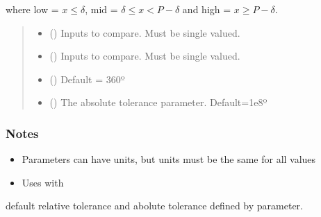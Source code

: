 \documentclass[letterpaper,10pt,english]{sphinxmanual}
\begin{document}
\begin{fulllineitems}
\sphinxAtStartPar
where low = \(x \leq \delta\), mid = \(\delta \leq x < P-\delta\) and
high = \(x \geq P - \delta\).
\begin{quote}\begin{description}
\begin{itemize}
\item {} 
\sphinxAtStartPar
{} (\sphinxstyleliteralemphasis{\sphinxupquote{, }}) \textendash{} Inputs to compare. Must be single valued.

\item {} 
\sphinxAtStartPar
{} (\sphinxstyleliteralemphasis{\sphinxupquote{, }}) \textendash{} Inputs to compare. Must be single valued.

\item {} 
\sphinxAtStartPar
{} () \textendash{} Default = 360º

\item {} 
\sphinxAtStartPar
{} () \textendash{} The absolute tolerance parameter. Default=1e\sphinxhyphen{}8º

\end{itemize}

\begin{description}
\end{description}

\end{description}\end{quote}
\subsubsection*{Notes}
\begin{itemize}
\item {} 
\sphinxAtStartPar
Parameters can have units, but units must be the same for all values

\item {} 
\sphinxAtStartPar
Uses  with

\end{itemize}

\sphinxAtStartPar
default relative tolerance and abolute tolerance defined by  parameter.

\end{fulllineitems}
\end{document}
